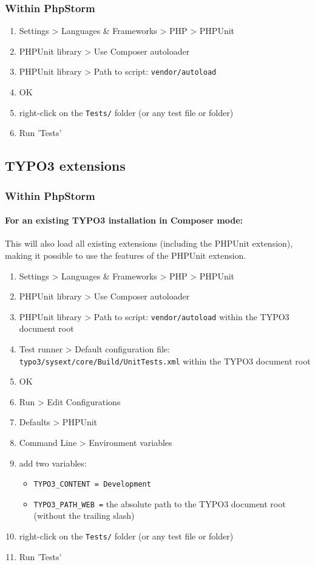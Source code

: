 \documentclass[a4paper,10pt,headsepline]{scrartcl}
\begin{document}
\subsubsection{Within PhpStorm}
\begin{enumerate}
  \item Settings > Languages \& Frameworks > PHP > PHPUnit
  \item PHPUnit library > Use Composer autoloader
  \item PHPUnit library > Path to script: \texttt{vendor/autoload}
  \item OK
  \item right-click on the \texttt{Tests/} folder (or any test file or folder)
  \item Run 'Tests'
\end{enumerate}


\subsection{TYPO3 extensions}

\subsubsection{Within PhpStorm}

\paragraph{For an existing TYPO3 installation in Composer mode:}

This will also load all existing extensions (including the PHPUnit extension), making it possible to use the features of the PHPUnit extension.

\begin{enumerate}
  \item Settings > Languages \& Frameworks > PHP > PHPUnit
  \item PHPUnit library > Use Composer autoloader
  \item PHPUnit library > Path to script: \texttt{vendor/autoload} within the TYPO3 document root
  \item Test runner > Default configuration file: \texttt{typo3/sysext/core/Build/UnitTests.xml} within the TYPO3 document root
  \item OK
  \item Run > Edit Configurations
  \item Defaults > PHPUnit
  \item Command Line > Environment variables
  \item add two variables:
    \begin{itemize}
      \item \texttt{TYPO3\_CONTENT = Development}
      \item \texttt{TYPO3\_PATH\_WEB =} the absolute path to the TYPO3 document root (without the trailing slash)
    \end{itemize}
  \item right-click on the \texttt{Tests/} folder (or any test file or folder)
  \item Run 'Tests'
\end{enumerate}
\end{document}
